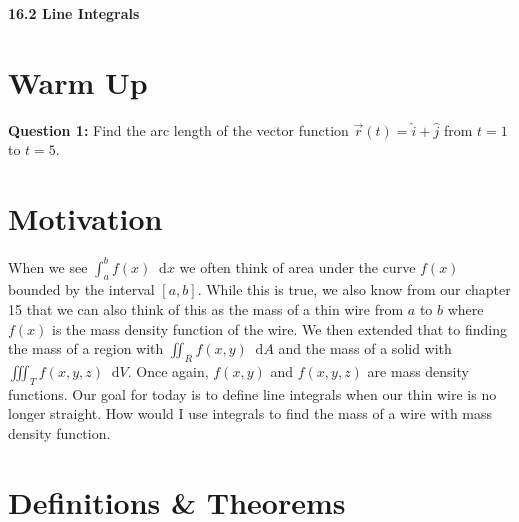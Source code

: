 \documentclass[11pt]{article}
\newcommand{\vs}{\vspace*{.1in}}
\newcommand*\dif{\mathop{}\!\mathrm{d}}
\begin{document}
\begin{LARGE}\begin{center}\bf 16.2 Line Integrals\end{center}
\end{LARGE}

\vs\vs



\section{Warm Up}
\textbf{Question 1:} Find the arc length of the vector function $\vec{r}(t) = \hat{i}+\hat{j}$ from $t = 1$ to $t = 5$.

\section{Motivation}
When we see $\int_a^b f(x) \dif{x}$ we often think of area under the curve $f(x)$ bounded by the interval $[a,b]$. While this is true, we also know from our chapter 15 that we can also think of this as the mass of a thin wire from $a$ to $b$ where $f(x)$ is the mass density function of the wire. We then extended that to finding the mass of a region with $\iint_R f(x,y) \dif{A}$ and the mass of a solid with $\iiint_T f(x,y,z) \dif{V}$. Once again, $f(x,y)$ and $f(x,y,z)$ are mass density functions. Our goal for today is to define line integrals when our thin wire is no longer straight. How would I use integrals to find the mass of a wire with mass density function.



\section{Definitions \& Theorems}
\end{document}
